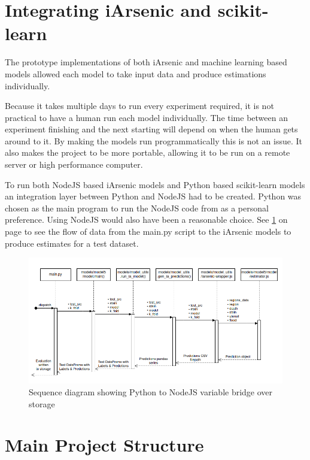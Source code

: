 \section{Integrating iArsenic and scikit-learn}

The prototype implementations of both iArsenic and machine learning based models allowed each model to take input data and produce estimations individually. 

Because it takes multiple days to run every experiment required, it is not practical to have a human run each model individually. The time between an experiment finishing and the next starting will depend on when the human gets around to it. By making the models run programmatically this is not an issue. It also makes the project to be more portable, allowing it to be run on a remote server or high performance computer.

To run both NodeJS based iArsenic models and Python based scikit-learn models an integration layer between Python and NodeJS had to be created. Python was chosen as the main program to run the NodeJS code from as a personal preference. Using NodeJS would also have been a reasonable choice. See \ref{fig:x ia_model_sd} on page \pageref{fig:x ia_model_sd} to see the flow of data from the main.py script to the iArsenic models to produce estimates for a test dataset.

\begin{figure}
    \centering
    \includegraphics[width=\textwidth]{figures/ia_model_sd.png} 
    \caption{Sequence diagram showing Python to NodeJS variable bridge over storage}
    \label{fig:x ia_model_sd}
\end{figure}

\section{Main Project Structure}

